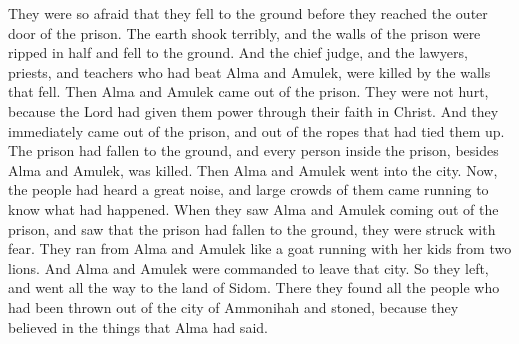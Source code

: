 They were so afraid that they fell to the ground before they reached the outer door of the prison. The earth shook terribly, and the walls of the prison were ripped in half and fell to the ground. And the chief judge, and the lawyers, priests, and teachers who had beat Alma and Amulek, were killed by the walls that fell.
\bverse \iffalse And Alma and Amulek came forth out of the prison, and they were not hurt; for the Lord had granted unto them power, according to their faith which was in Christ. And they straightway came forth out of the prison; and they were loosed from their bands; and the prison had fallen to the earth, and every soul within the walls thereof, save it were Alma and Amulek, was slain; and they straightway came forth into the city. \fi
Then Alma and Amulek came out of the prison. They were not hurt, because the Lord had given them power through their faith in Christ. And they immediately came out of the prison, and out of the ropes that had tied them up. The prison had fallen to the ground, and every person inside the prison, besides Alma and Amulek, was killed. Then Alma and Amulek went into the city.
\bverse \iffalse Now the people having heard a great noise came running together by multitudes to know the cause of it; and when they saw Alma and Amulek coming forth out of the prison, and the walls thereof had fallen to the earth, they were struck with great fear, and fled from the presence of Alma and Amulek even as a goat fleeth with her young from two lions; and thus they did flee from the presence of Alma and Amulek. \fi
Now, the people had heard a great noise, and large crowds of them came running to know what had happened. When they saw Alma and Amulek coming out of the prison, and saw that the prison had fallen to the ground, they were struck with fear. They ran from Alma and Amulek like a goat running with her kids from two lions. 
\bchapter
\bverse \iffalse And it came to pass that Alma and Amulek were commanded to depart out of that city; and they departed, and came out even into the land of Sidom; and behold, there they found all the people who had departed out of the land of Ammonihah, who had been cast out and stoned, because they believed in the words of Alma. \fi
And Alma and Amulek were commanded to leave that city. So they left, and went all the way to the land of Sidom. There they found all the people who had been thrown out of the city of Ammonihah and stoned, because they believed in the things that Alma had said.
\bverse \iffalse And they related unto them all that had happened unto their wives and children, and also concerning themselves, and of their power of deliverance. \fi
